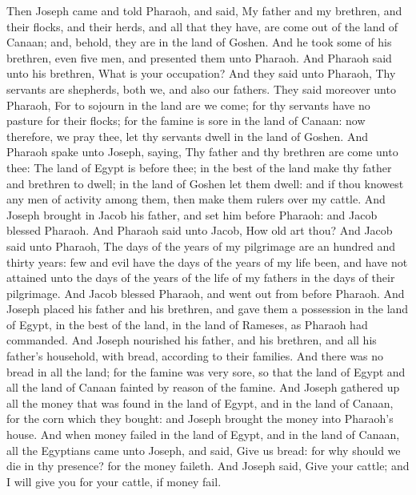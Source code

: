 \begin{biblechapter} %
\verse Then Joseph came and told Pharaoh, and said, My father and my brethren, and their flocks, and their herds, and all that they have, are come out of the land of Canaan; and, behold, they are in the land of Goshen.
\verse And he took some of his brethren, even five men, and presented them unto Pharaoh.
\verse And Pharaoh said unto his brethren, What is your occupation? And they said unto Pharaoh, Thy servants are shepherds, both we, and also our fathers.
\verse They said moreover unto Pharaoh, For to sojourn in the land are we come; for thy servants have no pasture for their flocks; for the famine is sore in the land of Canaan: now therefore, we pray thee, let thy servants dwell in the land of Goshen.
\verse And Pharaoh spake unto Joseph, saying, Thy father and thy brethren are come unto thee:
\verse The land of Egypt is before thee; in the best of the land make thy father and brethren to dwell; in the land of Goshen let them dwell: and if thou knowest any men of activity among them, then make them rulers over my cattle.
\verse And Joseph brought in Jacob his father, and set him before Pharaoh: and Jacob blessed Pharaoh.
\verse And Pharaoh said unto Jacob, How old art thou?
\verse And Jacob said unto Pharaoh, The days of the years of my pilgrimage are an hundred and thirty years: few and evil have the days of the years of my life been, and have not attained unto the days of the years of the life of my fathers in the days of their pilgrimage.
\verse And Jacob blessed Pharaoh, and went out from before Pharaoh.
\verse And Joseph placed his father and his brethren, and gave them a possession in the land of Egypt, in the best of the land, in the land of Rameses, as Pharaoh had commanded.
\verse And Joseph nourished his father, and his brethren, and all his father's household, with bread, according to their families.
 And there was no bread in all the land; for the famine was very sore, so that the land of Egypt and all the land of Canaan fainted by reason of the famine.
\verse And Joseph gathered up all the money that was found in the land of Egypt, and in the land of Canaan, for the corn which they bought: and Joseph brought the money into Pharaoh's house.
\verse And when money failed in the land of Egypt, and in the land of Canaan, all the Egyptians came unto Joseph, and said, Give us bread: for why should we die in thy presence? for the money faileth.
\verse And Joseph said, Give your cattle; and I will give you for your cattle, if money fail.

\end{biblechapter}
